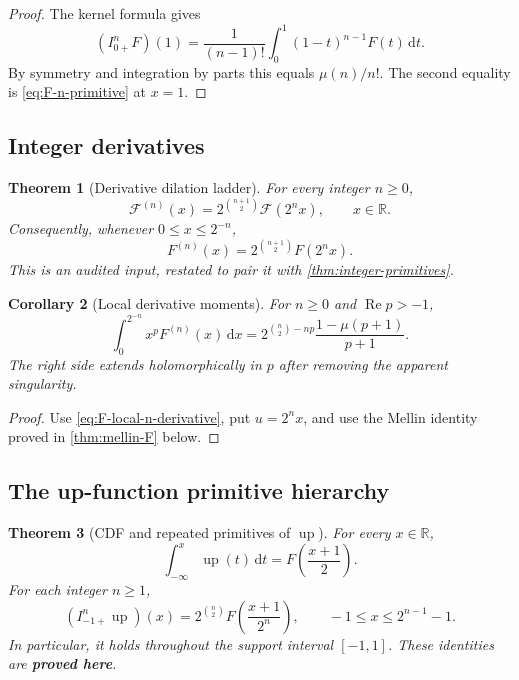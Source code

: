 \documentclass[11pt]{article}
\newcommand{\statusproved}{\textcolor{statusgreen}{\textbf{proved here}}}
\newtheorem{theorem}{Theorem}[section]
\newtheorem{corollary}[theorem]{Corollary}
\theoremstyle{definition}
\theoremstyle{remark}
\newcommand{\R}{\mathbb R}
\newcommand{\dd}{\,\mathrm d}
\newcommand{\Up}{\operatorname{up}}
\newcommand{\Ree}{\operatorname{Re}}
\newcommand{\extF}{\mathcal F}
\begin{document}
\begin{proof}
The kernel formula gives
\[
 (I_{0+}^{n}F)(1)=\frac1{(n-1)!}\int_0^1(1-t)^{n-1}F(t)\dd t.
\]
By symmetry and integration by parts this equals $\mu(n)/n!$.  The second equality is
\cref{eq:F-n-primitive} at $x=1$.
\end{proof}

\subsection{Integer derivatives}

\begin{theorem}[Derivative dilation ladder]
\label{thm:integer-derivatives}
For every integer $n\ge0$,
\begin{equation}
 \extF^{(n)}(x)=2^{\binom{n+1}{2}}\extF(2^nx),
 \qquad x\in\R.
 \label{eq:global-n-derivative}
\end{equation}
Consequently, whenever $0\le x\le2^{-n}$,
\begin{equation}
 F^{(n)}(x)=2^{\binom{n+1}{2}}F(2^nx).
 \label{eq:F-local-n-derivative}
\end{equation}
This is an audited input, restated to pair it with \cref{thm:integer-primitives}.
\end{theorem}

\begin{corollary}[Local derivative moments]
\label{cor:local-derivative-moments}
For $n\ge0$ and $\Ree p>-1$,
\begin{equation}
 \int_0^{2^{-n}}x^pF^{(n)}(x)\dd x
 =2^{\binom n2-np}\frac{1-\mu(p+1)}{p+1}.
 \label{eq:local-derivative-moment}
\end{equation}
The right side extends holomorphically in $p$ after removing the apparent singularity.
\end{corollary}

\begin{proof}
Use \cref{eq:F-local-n-derivative}, put $u=2^nx$, and use the Mellin identity proved in
\cref{thm:mellin-F} below.
\end{proof}

\subsection{The up-function primitive hierarchy}

\begin{theorem}[CDF and repeated primitives of $\Up$]
\label{thm:up-primitives}
For every $x\in\R$,
\begin{equation}
 \int_{-\infty}^{x}\Up(t)\dd t=F\!\left(\frac{x+1}{2}\right).
 \label{eq:up-cdf}
\end{equation}
For each integer $n\ge1$,
\begin{equation}
 (I_{-1+}^{n}\Up)(x)
 =2^{\binom n2}F\!\left(\frac{x+1}{2^n}\right),
 \qquad -1\le x\le 2^{n-1}-1.
 \label{eq:up-n-primitive}
\end{equation}
In particular, it holds throughout the support interval $[-1,1]$.  These identities are
\statusproved.
\end{theorem}
\end{document}
